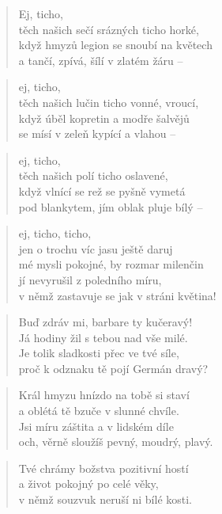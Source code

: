 \documentclass{book}
\begin{document}
\newpage
{}
\begin{verse}
Ej, ticho,\\
těch našich sečí srázných ticho horké,\\
když hmyzů legion se snoubí na květech\\
a tančí, zpívá, šílí v zlatém žáru --
\end{verse}
\begin{verse}
ej, ticho,\\
těch našich lučin ticho vonné, vroucí,\\
když úběl kopretin a modře šalvějů\\
se mísí v zeleň kypící a vlahou --
\end{verse}
\begin{verse}
ej, ticho,\\
těch našich polí ticho oslavené,\\
když vlnící se rež se pyšně vymetá\\
pod blankytem, jím oblak pluje bílý --
\end{verse}
\begin{verse}
ej, ticho, ticho,\\
jen o trochu víc jasu ještě daruj\\
mé mysli pokojné, by rozmar milenčin\\
jí nevyrušil z poledního míru,\\
v němž zastavuje se jak v stráni květina!
\end{verse}
\newpage
{}
\begin{verse}
Buď zdráv mi, barbare ty kučeravý!\\
Já hodiny žil s tebou nad vše milé.\\
Je tolik sladkosti přec ve tvé síle,\\
proč k odznaku tě pojí Germán dravý?
\end{verse}
\begin{verse}
Král hmyzu hnízdo na tobě si staví\\
a oblétá tě bzuče v slunné chvíle.\\
Jsi míru záštita a v lidském díle\\
och, věrně sloužíš pevný, moudrý, plavý.
\end{verse}
\begin{verse}
Tvé chrámy božstva pozitivní hostí\\
a život pokojný po celé věky,\\
v němž souzvuk neruší ni bílé kosti.
\end{verse}
\end{document}
